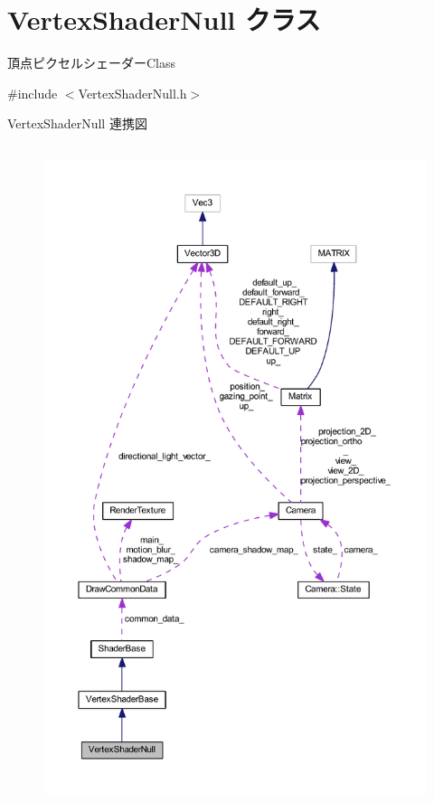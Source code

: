 \hypertarget{class_vertex_shader_null}{}\section{Vertex\+Shader\+Null クラス}
\label{class_vertex_shader_null}


頂点ピクセルシェーダー\+Class  




{\ttfamily \#include $<$Vertex\+Shader\+Null.\+h$>$}



Vertex\+Shader\+Null 連携図\nopagebreak
\begin{figure}[H]
\begin{center}
\leavevmode
\includegraphics[height=550pt]{class_vertex_shader_null__coll__graph}
\end{center}
\end{figure}

